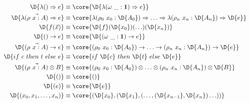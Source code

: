 \begin{description}[itemindent=0pt,left=0pt]
	\item[For expressions]
		\begin{align*}
			\D{\lambda() \Rightarrow e}                                        & \equiv \core{\D{\lambda(\omega\ \_ : \mathbf{1}) \Rightarrow e}}                                                                       \\
			\D{\lambda(\vec{\rho\ x : A}) \Rightarrow e}                       & \equiv \core{\lambda(\rho_0\ x_0 : \D{A_0}) \Rightarrow \ldots \Rightarrow \lambda(\rho_n\ x_n : \D{A_n}) \Rightarrow \D{e}}           \\
			\D{f(\vec{x})}                                                     & \equiv \core{\D{f}(\D{x_0})(\ldots)(\D{x_n})}                                                                                          \\
			\D{() \to e}                                                       & \equiv \core{\D{(\omega\ \_ : \mathbf{1}) \to e}}                                                                                      \\
			\D{(\vec{\rho\ x : A}) \to e}                                      & \equiv \core{(\rho_0\ x_0 : \D{A_0}) \to \ldots \to (\rho_n\ x_n : \D{A_n}) \to \D{e}}                                                 \\
			\D{if\ c\ then\ t\ else\ e}                                        & \equiv \core{if\ \D{c}\ then\ \D{t}\ else\ \D{e}}                                                                                      \\
			\D{(\vec{\rho\ x : A}) \otimes B}                                  & \equiv \core{(\rho_0\ x_0 : \D{A_0}) \otimes \ldots \otimes (\rho_n\ x_n : \D{A_n}) \otimes \D{B}}                                     \\
			\D{()}                                                             & \equiv \core{()}                                                                                                                       \\
			\D{(e)}                                                            & \equiv \core{\D{e}}                                                                                                                    \\
			\D{(x_0, x_1, \ldots, x_n)}                                        & \equiv \core{(\D{x_0}, (\D{x_1}, (\ldots, (\D{x_{n-1}}, \D{x_n})\ldots))}                                                              \\

\end{align*}
\end{description}
